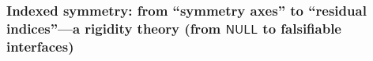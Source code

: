 \subsubsection{Indexed symmetry: from ``symmetry axes'' to ``residual indices''---a rigidity theory (from \texorpdfstring{$\mathsf{NULL}$}{NULL} to falsifiable interfaces)}\label{subsec:xi-certificate-coherence-orthogonal-axis-capacity}



\endinput
